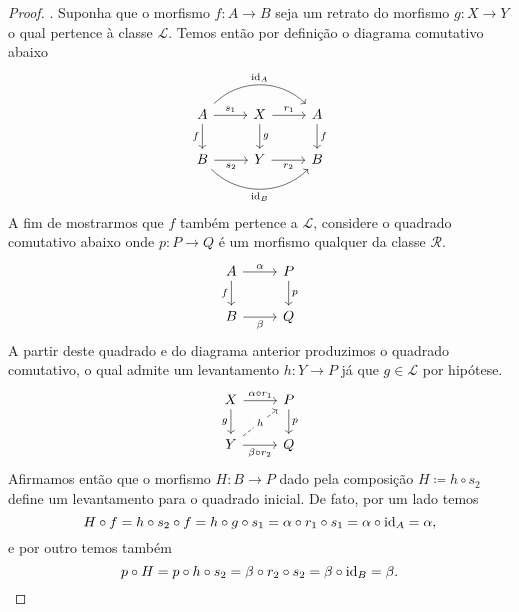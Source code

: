 \begin{proof}
  . Suponha que o morfismo $f: A \to B$ seja um retrato do morfismo $g: X \to Y$ o qual pertence à classe $\mathcal{L}$.
  Temos então por definição o diagrama comutativo abaixo
  \begin{displaymath}
    \begin{tikzcd}
      A
      \arrow[r, "s_{1}"]
      \arrow[d, "f" swap]
      \arrow[rr, bend left=45, "\id_{A}"]
      & X
      \arrow[r, "r_{1}"]
      \arrow[d, "g"]
      & A
      \arrow[d, "f"]
      \\ B
      \arrow[r, "s_{2}" swap]
      \arrow[rr, bend right=45, "\id_{B}" swap]
      & Y
      \arrow[r, "r_{2}" swap]
      & B
    \end{tikzcd}
  \end{displaymath}
  A fim de mostrarmos que $f$ também pertence a $\mathcal{L}$, considere o quadrado comutativo abaixo onde $p: P \to Q$ é um morfismo qualquer da classe $\mathcal{R}$.
  \begin{displaymath}
    \begin{tikzcd}
      A
      \arrow[r, "\alpha"]
      \arrow[d, "f" swap]
      & P
      \arrow[d, "p"]
      \\ B
      \arrow[r, "\beta" swap]
      & Q
    \end{tikzcd}
  \end{displaymath}
  A partir deste quadrado e do diagrama anterior produzimos o quadrado comutativo, o qual admite um levantamento $h: Y \to P$ já que $g \in \mathcal{L}$ por hipótese.
  \begin{displaymath}
    \begin{tikzcd}
      X
      \arrow[r, "\alpha \circ r_{1}"]
      \arrow[d, "g" swap]
      & P
      \arrow[d, "p"]
      \\ Y
      \arrow[r, "\beta \circ r_{2}" swap]
      \arrow[ru, dashed, "h" description]
      & Q
    \end{tikzcd}
  \end{displaymath}
  Afirmamos então que o morfismo $H: B \to P$ dado pela composição $H \coloneqq h \circ s_{2}$ define um levantamento para o quadrado inicial.
  De fato, por um lado temos
  \begin{displaymath}
    H \circ f = h \circ s_{2} \circ f = h \circ g \circ s_{1} = \alpha \circ r_{1} \circ s_{1} = \alpha \circ \mathrm{id}_{A} = \alpha,
  \end{displaymath}
  e por outro temos também
  \begin{displaymath}
    p \circ H = p \circ h \circ s_{2} = \beta \circ r_{2} \circ s_{2} = \beta \circ \mathrm{id}_{B} = \beta.
  \end{displaymath}


\end{proof}
